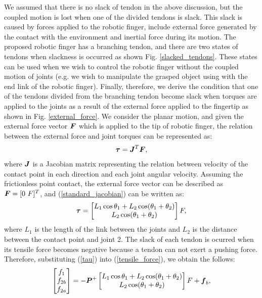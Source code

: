 \documentclass{llncs}
\def\vect#1{\mbox{\boldmath$#1$}}
\begin{document}
We assumed that there is no slack of tendon in the above discussion, but the coupled motion is lost when one of the divided tendons is slack.
This slack is caused by forces applied to the robotic finger, include external force generated by the contact with the environment and inertial force during its motion.
The proposed robotic finger has a branching tendon, and there are two states of tendons when slackness is occurred as shown Fig. \ref{slacked_tendons}.
These states can be used when we wish to control the robotic finger without the coupled motion of joints (e.g. we wish to manipulate the grasped object using with the end link of the robotic finger).
Finally, therefore, we derive the condition that one of the tendons divided from the branching tendon become slack when torques are applied to the joints as a result of the external force applied to the fingertip as shown in Fig. \ref{external_force}.
We consider the planar motion, and given the external force vector $\vect{F}$ which is applied to the tip of robotic finger, the relation between the external force and joint torques can be represented as:
\begin{align}
	\vect{\tau}=\vect{J}^{T}\vect{F},
\label{standard_jacobian}
\end{align}
where $\vect{J}$ is a Jacobian matrix representing the relation between velocity of the contact point in each direction and each joint angular velocity.
Assuming the frictionless point contact, the external force vector can be described as $\vect{F}=[0\ F]^{T}$, and (\ref{standard_jacobian}) can be written as:
\begin{align}
	\vect{\tau}=
		\begin{bmatrix}
	L_{1}\cos\theta_{1}+L_{2}\cos(\theta_{1}+\theta_{2})\\
	L_{2}\cos(\theta_{1}+\theta_{2})
		\end{bmatrix}F,
\label{tau}
\end{align}
where $L_{1}$ is the length of the link between the joints and $L_{2}$ is the distance between the contact point and joint 2.
The slack of each tendon is ocurred when its tensile force becomes negative because a tendon can not exert a pushing force.
Therefore, substituting (\ref{tau}) into (\ref{tensile_force}), we obtain the follows:
\begin{align}
	\begin{bmatrix}
	f_{1}\\
	f_{2b}\\
	f_{2a}
		\end{bmatrix}
	=-\vect{P}^{+}
		\begin{bmatrix}
	L_{1}\cos\theta_{1}+L_{2}\cos(\theta_{1}+\theta_{2})\\
	L_{2}\cos(\theta_{1}+\theta_{2})
		\end{bmatrix}
	F+\vect{f}_{b},	\label{eq:f-tau-pinv}
\end{align}
\end{document}
